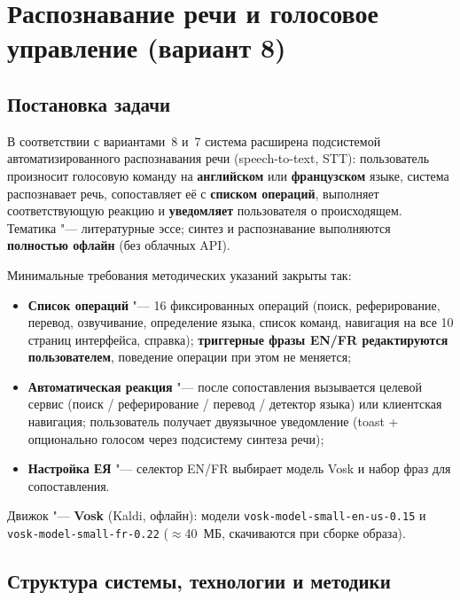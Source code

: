 \section{Распознавание речи и голосовое управление (вариант 8)}
\label{sec:recognize}

\subsection{Постановка задачи}

В соответствии с вариантами~8 и~7 система расширена подсистемой
автоматизированного распознавания речи (speech-to-text, STT): пользователь
произносит голосовую команду на \textbf{английском} или \textbf{французском}
языке, система распознавает речь, сопоставляет её с \textbf{списком
операций}, выполняет соответствующую реакцию и \textbf{уведомляет}
пользователя о происходящем. Тематика "--- литературные эссе; синтез и
распознавание выполняются \textbf{полностью офлайн} (без облачных API).

Минимальные требования методических указаний закрыты так:

\begin{itemize}
	\item \textbf{Список операций} "--- 16 фиксированных операций
	      (поиск, реферирование, перевод, озвучивание, определение языка,
	      список команд, навигация на все 10 страниц интерфейса,
	      справка); \textbf{триггерные
	      фразы EN/FR редактируются пользователем}, поведение операции
	      при этом не меняется;
	\item \textbf{Автоматическая реакция} "--- после сопоставления вызывается
	      целевой сервис (поиск / реферирование / перевод / детектор языка)
	      или клиентская навигация; пользователь получает двуязычное
	      уведомление (toast + опционально голосом через подсистему синтеза
	      речи);
	\item \textbf{Настройка ЕЯ} "--- селектор EN/FR выбирает модель Vosk
	      и набор фраз для сопоставления.
\end{itemize}

Движок "--- \textbf{Vosk} (Kaldi, офлайн): модели
\texttt{vosk-model-small-en-us-0.15} и \texttt{vosk-model-small-fr-0.22}
($\approx$40~МБ, скачиваются при сборке образа).

\subsection{Структура системы, технологии и методики}

